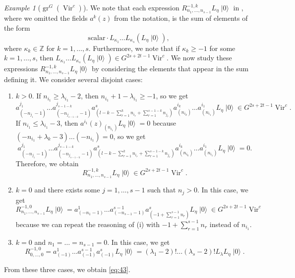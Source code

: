 \documentclass[a4paper, 12pt, reqno]{amsart}
\theoremstyle{remark}
\newtheorem{example}[theorem]{Example}
\DeclareMathOperator{\Vir}{Vir}
\DeclareMathOperator{\gr}{gr}
\DeclareMathOperator{\vac}{|0\rangle}
\begin{document}
\begin{example}[$\gr^G(\Vir^c)$]
  We note that each expression $R^{-1, k}_{n_1, \dots, n_{s - 1}}L_{\eta}\vac$ in , where we omitted the fields $a^k(z)$ from the notation, is the sum of elements of the form
  \begin{equation*}
    \text{scalar}\cdot L_{\kappa_1}\dots L_{\kappa_s}(L_{\eta}\vac),
  \end{equation*}
  where $\kappa_k \in \mathbb{Z}$ for $k = 1, \dots, s$.
  Furthermore, we note that if $\kappa_k \ge -1$ for some $k = 1, \dots, s$, then $L_{\kappa_1}\dots L_{\kappa_s}(L_{\eta}\vac) \in G^{2s + 2t - 1}\Vir^c$.
  We now study these expressions $R^{-1, k}_{n_1, \dots, n_{s - 1}}L_{\eta}\vac$ by considering the elements that appear in the sum defining it.
  We consider several disjoint cases:
  \begin{enumerate}
  \item $k > 0$.
    If $n_{i_1} \ge \lambda_{i_1} - 2$, then $n_{i_1} + 1 - \lambda_{i_1} \ge -1$, so we get
    \begin{equation*}
      a^{j_1}_{(-n_{j_1} - 1)}\dots a^{j_{s - 1 - k}}_{(-n_{j_{s - 1 - k}} - 1)}a^s_{(l - k - \sum_{r = 1}^kn_{i_r} + \sum_{r = 1}^{s - 1 - k}n_{j_r})}a^{i_k}_{(n_{i_k})}\dots a^{i_1}_{(n_{i_1})}L_{\eta}\vac \in G^{2s + 2t - 1}\Vir^c.
    \end{equation*}
    If $n_{i_1} \le \lambda_{i_1} - 3$, then $a^{i_1}(z)_{(n_{i_1})}L_{\eta}\vac = 0$ because $(-n_{i_1} + \lambda_k - 3)\dots(-n_{i_1}) = 0$, so we get
    \begin{equation*}
      a^{j_1}_{(-n_{j_1} - 1)}\dots a^{j_{s - 1 - k}}_{(-n_{j_{s - 1 - k}} - 1)}a^s_{(l - k - \sum_{r = 1}^kn_{i_r} + \sum_{r = 1}^{s - 1 - k}n_{j_r})}a^{i_k}_{(n_{i_k})}\dots a^{i_1}_{(n_{i_1})}L_{\eta}\vac = 0.
    \end{equation*}
    Therefore, we obtain
    \begin{equation*}
      R^{-1, k}_{n_1, \dots, n_{s - 1}}L_{\eta}\vac \in G^{2s + 2t - 1}\Vir^c.
    \end{equation*}
  \item $k = 0$ and there exists some $j = 1, \dots, s - 1$ such that $n_j > 0$.
    In this case, we get
    \begin{equation*}
      R^{-1, 0}_{n_1, \dots, n_{s - 1}}L_{\eta}\vac = a^1_{(-n_1 - 1)}\dots a^{s - 1}_{(-n_{s - 1} - 1)}a^s_{(-1 + \sum_{r = 1}^{s - 1}n_r)}L_{\eta}\vac \in G^{2s + 2t - 1}\Vir^c
    \end{equation*}
    because we can repeat the reasoning of (i) with $-1 + \sum_{r = 1}^{s - 1}n_r$ instead of $n_{i_1}$.
  \item $k = 0$ and $n_1 = \dots = n_{s - 1} = 0$.
    In this case, we get
    \begin{equation*}
      R^{-1, 0}_{0, \dots, 0} = a^1_{(-1)}\dots a^{s - 1}_{(-1)}a^s_{(-1)}L_{\eta}\vac = (\lambda_1 - 2)!\dots(\lambda_s - 2)!L_{\lambda}L_{\eta}\vac.
    \end{equation*}
  \end{enumerate}
  From these three cases, we obtain \eqref{eq:43}.


\end{example}
\end{document}
